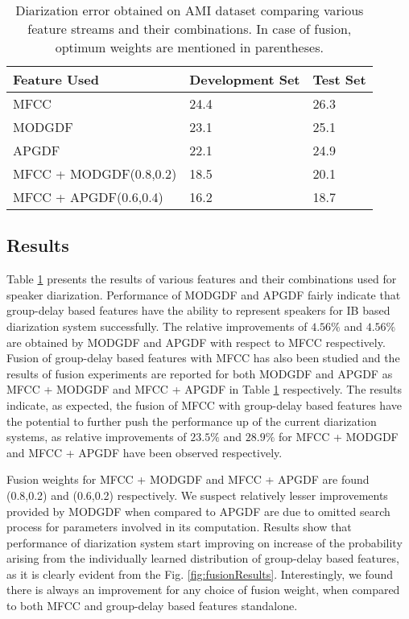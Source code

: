 \documentclass[conference]{IEEEtran}
\begin{document}
\begin{table}[h]
\centering
\label{my-label}
\begin{tabular}{|l|l|l|}
\hline
Feature Used  & Development Set & Test Set \\ \hline
MFCC          & 24.4                   & 26.3            \\ \hline
MODGDF        & 23.1                   & 25.1            \\ \hline
APGDF         & 22.1                   & 24.9            \\ \hline
MFCC + MODGDF(0.8,0.2) & 18.5          & 20.1            \\ \hline
MFCC + APGDF(0.6,0.4)  & 16.2          & 18.7            \\ \hline
\end{tabular}
\vspace{0.4cm}
\label{table:results}
\caption{Diarization error obtained on AMI dataset comparing various feature streams and their combinations. In case of fusion, optimum weights are mentioned in parentheses.}
\end{table}


\subsection{Results}

Table \ref{table:results} presents the results of various features and their combinations used for speaker diarization. Performance of MODGDF and APGDF fairly indicate that group-delay based features have the ability to represent speakers for IB based diarization system successfully. The relative improvements of $4.56\%$ and $4.56\%$ are obtained by MODGDF and APGDF with respect to MFCC respectively. Fusion of group-delay based features with MFCC has also been studied and the results of fusion experiments are reported for both MODGDF and APGDF as MFCC + MODGDF and MFCC + APGDF in Table \ref{table:results} respectively. The results indicate, as expected, the fusion of MFCC with group-delay based features have the potential to further push the performance up of the current diarization systems, as relative improvements of $23.5\%$ and $28.9\%$ for MFCC + MODGDF and MFCC + APGDF have been observed respectively.

Fusion weights for MFCC + MODGDF and MFCC + APGDF are found (0.8,0.2) and (0.6,0.2) respectively. We suspect relatively lesser improvements provided by MODGDF when compared to APGDF are due to omitted search process for parameters involved in its computation. Results show that performance of diarization system start improving on increase of the probability arising from the individually learned distribution of group-delay based features, as it is clearly evident from the Fig. \ref{fig:fusionResults}. Interestingly, we found there is always an improvement for any choice of fusion weight, when compared to both MFCC and group-delay based features standalone.     
\end{document}
